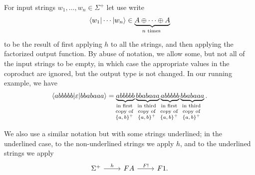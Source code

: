 For  input strings $w_1,\ldots,w_n \in \Sigma^+$ let use write 
\begin{align*}
\tuple{w_1| \cdots | w_n} \in \myunderbrace{A \oplus \cdots \oplus A}{$n$ times}
\end{align*}
to be the result of first applying $h$ to all the strings, and then applying the factorized output function. By abuse of notation, we allow some, but not all of the input strings to be empty, in which case the appropriate values in the coproduct are ignored, but the output type is not changed. In our running example, we have
\begin{align*}
    \tuple{abbbbb | \varepsilon | bbabaaa} =  
    \myunderbrace{abbbbb}{in first \\ copy of \\ $\set{a,b}^+$}
     \myunderbrace{bbabaaa}{in third \\ copy of \\ $\set{a,b}^+$}
     \myunderbrace{abbbbb}{in first \\ copy of \\ $\set{a,b}^+$}
     \myunderbrace{bbabaaa}{in third \\ copy of \\ $\set{a,b}^+$}.
    \end{align*}


We also use a similar notation but with some strings underlined; in the underlined case, to the non-underlined strings we apply $h$, and to the underlined strings we apply 
\[
\begin{tikzcd}
\Sigma^+ 
\ar[r,"h"]
&
\functor A 
\ar[r,"\functor !"]
&
\functor 1.
\end{tikzcd}
\]



